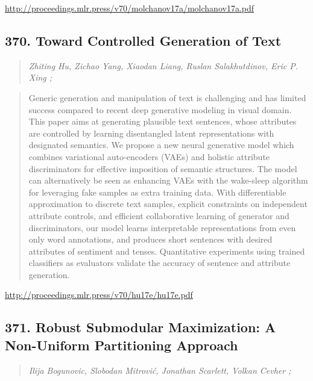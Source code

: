 \documentclass{article}
\begin{document}
\href{http://proceedings.mlr.press/v70/molchanov17a/molchanov17a.pdf}{http://proceedings.mlr.press/v70/molchanov17a/molchanov17a.pdf}

\subsection{370. Toward Controlled Generation of Text}

\begin{quote}
\footnotesize{\textit{Zhiting Hu, Zichao Yang, Xiaodan Liang, Ruslan Salakhutdinov, Eric P. Xing ;}}
\end{quote}

\begin{quote}
    Generic generation and manipulation of text is challenging and has limited success compared to recent deep generative modeling in visual domain. This paper aims at generating plausible text sentences, whose attributes are controlled by learning disentangled latent representations with designated semantics. We propose a new neural generative model which combines variational auto-encoders (VAEs) and holistic attribute discriminators for effective imposition of semantic structures. The model can alternatively be seen as enhancing VAEs with the wake-sleep algorithm for leveraging fake samples as extra training data. With differentiable approximation to discrete text samples, explicit constraints on independent attribute controls, and efficient collaborative learning of generator and discriminators, our model learns interpretable representations from even only word annotations, and produces short sentences with desired attributes of sentiment and tenses. Quantitative experiments using trained classifiers as evaluators validate the accuracy of sentence and attribute generation.  \end{quote}

\href{http://proceedings.mlr.press/v70/hu17e/hu17e.pdf}{http://proceedings.mlr.press/v70/hu17e/hu17e.pdf}

\subsection{371. Robust Submodular Maximization: A Non-Uniform Partitioning Approach}

\begin{quote}
\footnotesize{\textit{Ilija Bogunovic, Slobodan Mitrović, Jonathan Scarlett, Volkan Cevher ;}}
\end{quote}
\end{document}

